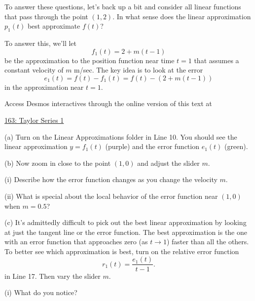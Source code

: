 \documentclass{ximera}
\begin{document}
To answer these questions, let's back up a bit and consider all linear functions that pass through the point $(1,2)$. In what sense does the linear approximation $p_1(t)$ best approximate $f(t)$?

To answer this, we'll let
\[
   f_1(t) = 2 + m(t-1)
\]
be the approximation to the position function near time $t=1$ that assumes a constant velocity of $m$ m/sec. The key idea is to look at the error
\[
    e_1(t) = f(t) - f_1(t) = f(t) - (2 + m(t-1))
\]
in the approximation near $t=1$.

\begin{exploration}\label{Exp3:Comp}

 
\begin{onlineOnly}
    \begin{center}
\end{center}
\end{onlineOnly}

Access Desmos interactives through the online version of this text at
 
\href{https://www.desmos.com/calculator/ueb0dgixdq}{163: Taylor Series 1}


(a) Turn on the Linear Approximations folder in Line 10. You should see the linear approximation $y=f_1(t)$ (purple) and the error function $e_1(t)$ (green).

(b) Now zoom in close to the point $(1,0)$ and adjust the slider $m$.
\begin{question} \label{Qfdsg677}
(i) Describe how the error function changes as you change the velocity $m$.

(ii) What is special about the local behavior of the error function near $(1,0)$ when $m=0.5$?
\end{question}

(c) It's admittedly difficult to pick out the best linear approximation by looking at just the tangent line or the error function. The best approximation is the one with an error function that approaches zero (as $t\to 1$) faster than all the others. To better see which approximation is best, turn on the relative error function
\[
    r_1 (t) = \frac{e_1(t)}{t-1} .
\]
in Line 17. Then vary the slider $m$.

\begin{question} \label{Q3435rgg}
(i) What do you notice? 


\end{question}
\end{exploration}
\end{document}
